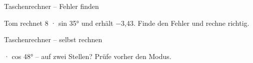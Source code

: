 \begin{aufgabe}{Taschenrechner – Fehler finden}
\begin{teile}
\teil Tom rechnet 8 · sin 35° und erhält −3,43. Finde den Fehler und rechne richtig.
\end{teile}
\end{aufgabe}

\begin{aufgabe}{Taschenrechner – selbst rechnen}
\begin{teile}
 · cos 48° – auf zwei Stellen? Prüfe vorher den Modus. \leerfeld
\end{teile}
\end{aufgabe}
